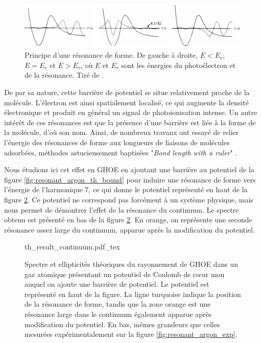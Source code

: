 \begin{figure}[!ht]
\centering
\includegraphics[width=1\columnwidth]{Figures/ResonantArgon/shape_resonance.pdf}%
\caption{Principe d'une résonance de forme. De gauche à droite, $E<E_r$, $E=E_r$ et $E>E_r$, où $E$ et $E_r$ sont les énergies du photoélectron et de la résonance. Tiré de .}
\label{fig:shaperesonance}
\end{figure}

De par sa nature, cette barrière de potentiel se situe relativement proche de la molécule. L'électron est ainsi spatialement localisé, ce qui augmente la densité électronique et produit en général un signal de photoionisation intense. Un autre intérêt de ces résonances est que la présence d'une barrière est liée à la forme de la molécule, d'où son nom. Ainsi, de nombreux travaux ont essayé de relier l'énergie des résonances de forme aux longueurs de liaisons de molécules adsorbées, méthodes astucieusement baptisées "\textit{Bond length with a ruler}" .

Nous étudions ici cet effet en GHOE en ajoutant une barrière au potentiel de la figure \ref{fig:resonant_argon_th_bound} pour induire une résonance de forme vers l'énergie de l'harmonique 7, ce qui donne le potentiel représenté en haut de la figure \ref{fig:resonant_argon_th_continuum}. Ce potentiel ne correspond pas forcément à un système physique, mais nous permet de démontrer l'effet de la résonance du continuum. Le spectre obtenu est présenté en bas de la figure \ref{fig:resonant_argon_th_continuum}. En orange, on représente une seconde résonance assez large du continuum, apparue après la modification du potentiel.

\begin{figure}[!ht]
\centering
\def\svgwidth{1\columnwidth}
{th_result_continuum.pdf_tex}
\caption{Spectre et ellipticités théoriques du rayonnement de GHOE dans un gaz atomique présentant un potentiel de Coulomb de cœur mou auquel on ajoute une barrière de potentiel. Le potentiel est représenté en haut de la figure. La ligne turquoise indique la position de la résonance de forme, tandis que la zone orange est une résonance large dans le continuum également apparue après modification du potentiel. En bas, mêmes grandeurs que celles mesurées expérimentalement sur la figure \ref{fig:resonant_argon_exp}.}
\label{fig:resonant_argon_th_continuum}
\end{figure}

